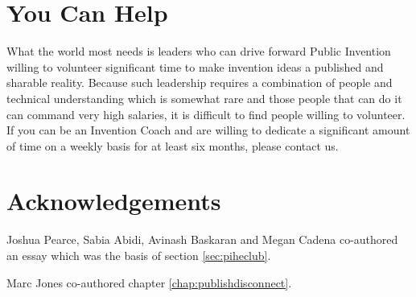 \documentclass[
	fontsize=10pt, %
	twoside=false, %
	secnumdepth=1, %
]{kaobook}
\begin{document}
\chapter{You Can Help}

What the world most needs is leaders who can drive forward
Public Invention willing to volunteer significant time
to make invention ideas a published and sharable reality.
Because such leadership requires a combination of people and
technical understanding which is somewhat rare and those
people that can do it can command very high salaries,
it is difficult to find people willing to volunteer.
If you can be an Invention Coach and are willing to
dedicate a significant amount of time on a weekly basis
for at least six months, please contact us.




\appendix %



\chapter*{Acknowledgements}

Joshua Pearce, Sabia Abidi, Avinash Baskaran and Megan Cadena co-authored an essay which was the basis of section \ref{sec:piheclub}.

Marc Jones co-authored chapter \ref{chap:publishdisconnect}.


\backmatter %



\printbibliography[heading=bibintoc, title=Bibliography, prenote=bibnote] %



\printindex %
\end{document}
